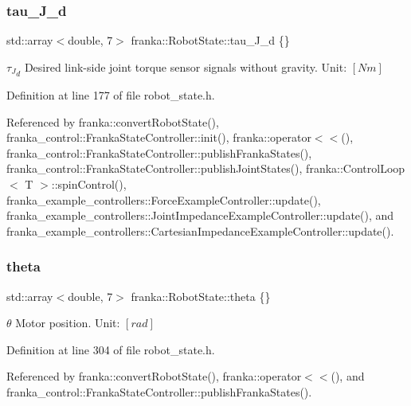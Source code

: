 \subsubsection{\texorpdfstring{tau\+\_\+\+J\+\_\+d}{tau\_J\_d}}
{\footnotesize\ttfamily std\+::array$<$double, 7$>$ franka\+::\+Robot\+State\+::tau\+\_\+\+J\+\_\+d \{\}}

${\tau_J}_d$ Desired link-\/side joint torque sensor signals without gravity. Unit\+: $[Nm]$ 

Definition at line 177 of file robot\+\_\+state.\+h.



Referenced by franka\+::convert\+Robot\+State(), franka\+\_\+control\+::\+Franka\+State\+Controller\+::init(), franka\+::operator$<$$<$(), franka\+\_\+control\+::\+Franka\+State\+Controller\+::publish\+Franka\+States(), franka\+\_\+control\+::\+Franka\+State\+Controller\+::publish\+Joint\+States(), franka\+::\+Control\+Loop$<$ T $>$\+::spin\+Control(), franka\+\_\+example\+\_\+controllers\+::\+Force\+Example\+Controller\+::update(), franka\+\_\+example\+\_\+controllers\+::\+Joint\+Impedance\+Example\+Controller\+::update(), and franka\+\_\+example\+\_\+controllers\+::\+Cartesian\+Impedance\+Example\+Controller\+::update().

\mbox{\label{structfranka_1_1RobotState_aa34145d77dd411d7ca578c355f0ba2b4}} 
\subsubsection{\texorpdfstring{theta}{theta}}
{\footnotesize\ttfamily std\+::array$<$double, 7$>$ franka\+::\+Robot\+State\+::theta \{\}}

$\theta$ Motor position. Unit\+: $[rad]$ 

Definition at line 304 of file robot\+\_\+state.\+h.



Referenced by franka\+::convert\+Robot\+State(), franka\+::operator$<$$<$(), and franka\+\_\+control\+::\+Franka\+State\+Controller\+::publish\+Franka\+States().

\mbox{\label{structfranka_1_1RobotState_aabfdabeaef8c1858c52dd32344bdd039}} 
